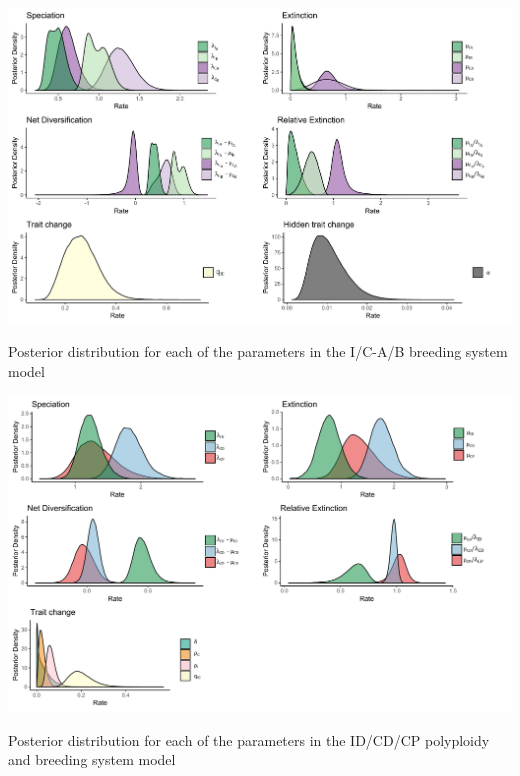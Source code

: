 \begin{suppfigure}
\includegraphics[width=\textwidth]{hisseSInoretposteriordist.pdf}
\caption{Posterior distribution for each of the parameters in the I/C-A/B breeding system model} %
\label{suppfigure:ICAB}
\end{suppfigure}

\begin{suppfigure}
\includegraphics[width=\textwidth]{musseDPSIposteriordist.pdf}
\caption{Posterior distribution for each of the parameters in the ID/CD/CP polyploidy and breeding system model} %
\label{suppfigure:IDCDCP}
\end{suppfigure}

